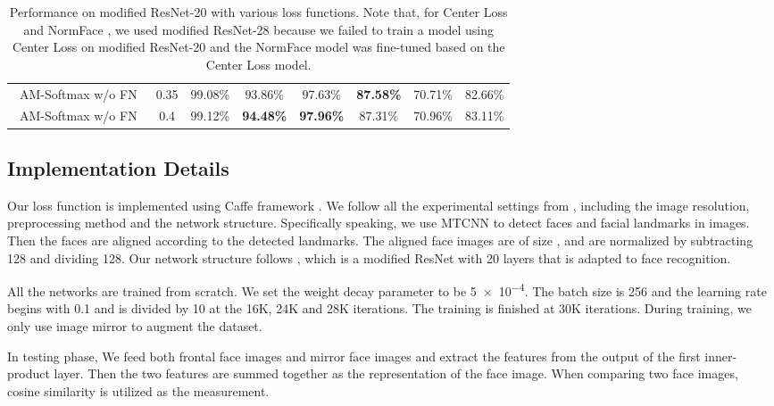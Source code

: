 \documentclass[10pt,twocolumn,letterpaper]{article}
\begin{document}
\begin{table*}
\begin{threeparttable}
\begin{tabular}{cccccccc}
			\midrule
			AM-Softmax w/o FN　& 0.35 & 99.08\% & 93.86\% & 97.63\% & \textbf{87.58\%} & 70.71\% & 82.66\%\\
			AM-Softmax w/o FN　& 0.4 & 99.12\% & \textbf{94.48\%} & \textbf{97.96\%} & 87.31\% & 70.96\% & 83.11\% \\
			\bottomrule
		\end{tabular}
		\vspace{1mm}
		\caption{Performance on modified ResNet-20 with various loss functions. Note that, for Center Loss \cite{wen2016discriminative} and NormFace \cite{wang2017normface}, we used modified ResNet-28 \cite{wen2016discriminative} because we failed to train a model using Center Loss on modified ResNet-20 \cite{liu2017sphereface} and the NormFace model was fine-tuned based on the Center Loss model.}
	\end{threeparttable}
\end{table*}

\subsection{Implementation Details}

Our loss function is implemented using Caffe framework \cite{jia2014caffe}. We follow all the experimental settings from \cite{liu2017sphereface}, including the image resolution, preprocessing method and the network structure.
Specifically speaking, we use MTCNN \cite{zhang2016joint} to detect faces and facial landmarks in images. Then the faces are aligned according to the detected landmarks. The aligned face images are of size , and are normalized by subtracting 128 and dividing 128. Our network structure follows \cite{liu2017sphereface}, which is a modified ResNet \cite{he2016deep} with 20 layers that is adapted to face recognition.

All the networks are trained from scratch. We set the weight decay parameter to be \num{5e-4}. The batch size is 256 and the learning rate begins with 0.1 and is divided by 10 at the 16K, 24K and 28K iterations. The training is finished at 30K iterations. During training, we only use image mirror to augment the dataset. 

In testing phase, We feed both frontal face images and mirror face images and extract the features from the output of the first inner-product layer. Then the two features are summed together as the representation of the face image. When comparing two face images, cosine similarity is utilized as the measurement. 
\end{document}
